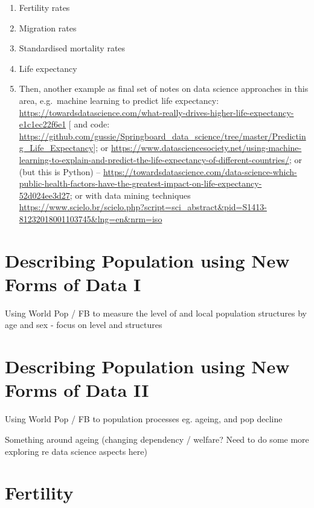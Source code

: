 \documentclass[
]{book}
\begin{document}
\begin{enumerate}
\def\labelenumi{\alph{enumi}.}
\item
  Fertility rates
\item
  Migration rates
\item
  Standardised mortality rates
\item
  Life expectancy
\item
  Then, another example as final set of notes on data science approaches in this area, e.g.~machine learning to predict life expectancy: \url{https://towardsdatascience.com/what-really-drives-higher-life-expectancy-e1c1ec22f6e1} {[} and code: \url{https://github.com/gussie/Springboard_data_science/tree/master/Predicting_Life_Expectancy}{]}; or \url{https://www.datasciencesociety.net/using-machine-learning-to-explain-and-predict-the-life-expectancy-of-different-countries/}; or (but this is Python) -- \url{https://towardsdatascience.com/data-science-which-public-health-factors-have-the-greatest-impact-on-life-expectancy-52d024ee3d27}; or with data mining techniques \url{https://www.scielo.br/scielo.php?script=sci_abstract\&pid=S1413-81232018001103745\&lng=en\&nrm=iso}
\end{enumerate}

\hypertarget{describing-population-using-new-forms-of-data-i}{%
\chapter{Describing Population using New Forms of Data I}\label{describing-population-using-new-forms-of-data-i}}

Using World Pop / FB to measure the level of and local population structures by age and sex - focus on level and structures

\hypertarget{describing-population-using-new-forms-of-data-ii}{%
\chapter{Describing Population using New Forms of Data II}\label{describing-population-using-new-forms-of-data-ii}}

Using World Pop / FB to population processes eg. ageing, and pop decline

Something around ageing (changing dependency / welfare? Need to do some more exploring re data science aspects here)

\hypertarget{fertility}{%
\chapter{Fertility}\label{fertility}}
\end{document}
